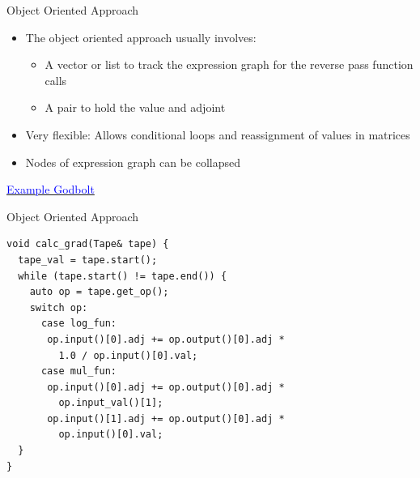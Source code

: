\documentclass[dvipsnames]{beamer}
\newenvironment{CacheLine}[1][]{
  \begin{tikzpicture}[x=1.2cm,y=0.8cm,font=\footnotesize,>=Stealth,#1]
    \def\CacheH{1.0}   %
    \def\CacheBelow{1.0} %

}{
    \foreach \i in {1,...,7} { \draw[black!40] (\i,0) -- (\i,\CacheH); }
    \draw[line width=0.6pt, rounded corners=2pt] (0,0) rectangle (8,\CacheH);
    \foreach \i in {0,...,7} {
      \node[below=3pt, text=black!75] at (\i+0.5,0) {8B \i};
    }
  \end{tikzpicture}
}
\newcommand{\CacheColor}[2]{%
  \fill[#2, fill opacity=0.35, draw=none] (#1,0) rectangle ++(1,\CacheH);%
}
\newcommand{\CacheMarkBelow}[3][green!60!black]{%
  \draw[-{Stealth[length=3mm]}, very thick, draw=#1] (#2,-\CacheBelow+0.28) -- (#2,0.02);
  \node[below, text=#1] at (#2,-\CacheBelow+0.28) {#3};
}
\newcommand{\CacheSetBelow}[1]{\def\CacheBelow{#1}}
\begin{document}
\begin{frame}{Object Oriented Approach}
\begin{itemize}
    \item The object oriented approach usually involves:
    \begin{itemize}
        \item A vector or list to track the expression graph for the reverse pass function calls
        \item A pair to hold the value and adjoint
    \end{itemize}
    \item Very flexible: Allows conditional loops and reassignment of values in matrices
    \item Nodes of expression graph can be collapsed
\end{itemize}
\centerline{\href{https://godbolt.org/z/je173T18Y}{\textcolor{blue}{Example Godbolt}}}
\end{frame}



\begin{frame}[fragile]{Object Oriented Approach}
\begin{verbatim}
void calc_grad(Tape& tape) {
  tape_val = tape.start();
  while (tape.start() != tape.end()) {
    auto op = tape.get_op();
    switch op:
      case log_fun:
       op.input()[0].adj += op.output()[0].adj *
         1.0 / op.input()[0].val;
      case mul_fun:
       op.input()[0].adj += op.output()[0].adj *
         op.input_val()[1];
       op.input()[1].adj += op.output()[0].adj *
         op.input()[0].val;
  }
}
\end{verbatim}
\end{frame}
\end{document}
